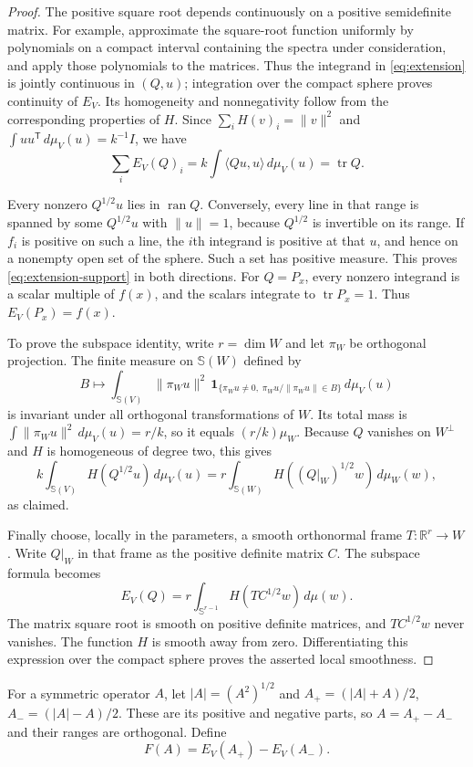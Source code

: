 \begin{proof}
The positive square root depends continuously on a positive semidefinite
matrix.  For example, approximate the square-root function uniformly by
polynomials on a compact interval containing the spectra under
consideration, and apply those polynomials to the matrices.
Thus the integrand in \eqref{eq:extension} is jointly continuous in
$(Q,u)$; integration over the compact sphere proves continuity of $E_V$.
Its homogeneity and nonnegativity follow from the corresponding properties
of $H$.  Since $\sum_i H(v)_i=\|v\|^2$ and
$\int uu^{\mathsf T}\,d\mu_V(u)=k^{-1}I$, we have
\[
 \sum_i E_V(Q)_i=k\int\langle Qu,u\rangle\,d\mu_V(u)
 =\operatorname{tr}Q.
\]

Every nonzero $Q^{1/2}u$ lies in $\operatorname{ran}Q$.
Conversely, every line in that range is spanned by some $Q^{1/2}u$ with
$\|u\|=1$, because $Q^{1/2}$ is invertible on its range.
If $f_i$ is positive on such a line, the $i$th integrand is positive at
that $u$, and hence on a nonempty open set of the sphere.  Such a set has
positive measure.  This proves \eqref{eq:extension-support} in both
directions.  For $Q=P_x$, every nonzero integrand is a scalar multiple
of $f(x)$, and the scalars integrate to $\operatorname{tr}P_x=1$.
Thus $E_V(P_x)=f(x)$.

To prove the subspace identity, write $r=\dim W$ and let $\pi_W$ be
orthogonal projection.  The finite measure on $\mathbb S(W)$ defined by
\[
 B\longmapsto\int_{\mathbb S(V)}
 \|\pi_Wu\|^2\,\mathbf1_{\{\pi_Wu\ne0,\;
                  \pi_Wu/\|\pi_Wu\|\in B\}}\,d\mu_V(u)
\]
is invariant under all orthogonal transformations of $W$.  Its total mass is
$\int\|\pi_Wu\|^2\,d\mu_V(u)=r/k$, so it equals
$(r/k)\mu_W$.  Because $Q$ vanishes on $W^\perp$ and $H$ is homogeneous
of degree two, this gives
\[
 k\int_{\mathbb S(V)}H(Q^{1/2}u)\,d\mu_V(u)
 =r\int_{\mathbb S(W)}H((Q|_W)^{1/2}w)\,d\mu_W(w),
\]
as claimed.

Finally choose, locally in the parameters, a smooth orthonormal frame
$T:\mathbb R^r\to W$.  Write $Q|_W$ in that frame as the positive
definite matrix $C$.  The subspace formula becomes
\[
 E_V(Q)=r\int_{\mathbb S^{r-1}}H(TC^{1/2}w)\,d\mu(w).
\]
The matrix square root is smooth on positive definite matrices, and
$TC^{1/2}w$ never vanishes.  The function $H$ is smooth away from zero.
Differentiating this expression over the compact sphere proves the
asserted local smoothness.
\end{proof}

For a symmetric operator $A$, let $|A|=(A^2)^{1/2}$ and
$A_+=(|A|+A)/2$, $A_-=(|A|-A)/2$.  These are its positive and negative
parts, so $A=A_+-A_-$ and their ranges are orthogonal.  Define
\begin{equation}
 F(A)=E_V(A_+)-E_V(A_-).
 \label{eq:signed-extension}
\end{equation}

